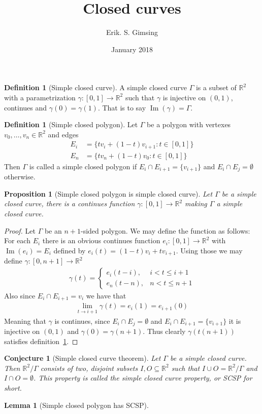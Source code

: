 \documentclass[a4paper,11pt]{article}
\title{Closed curves}
\author{Erik. S. Gimsing}
\date{January 2018}
\theoremstyle{plain}
\newtheorem{proposition}[theorem]{Proposition}
\newtheorem{lemma}[theorem]{Lemma}
\newtheorem{conjecture}[theorem]{Conjecture}
\theoremstyle{definition}
\newtheorem{definition}[theorem]{Definition}
\newcommand{\R}{\mathbb{R}}
\DeclareMathOperator{\im}{Im}
\begin{document}
\maketitle
\begin{definition}[Simple closed curve]\label{def:simple_closed_curve}
	A simple closed curve $\Gamma$ is a subset of $\R^2$ with a parametrization
	$\gamma:[0,1]\to\R^2$ such that $\gamma$ is injective on $(0,1)$, continues
	and $\gamma(0)=\gamma(1)$. That is to say $\im(\gamma)=\Gamma$.
\end{definition}
\begin{definition}[Simple closed polygon]\label{def:simple_closed_polygon}
	Let $\Gamma$ be a polygon with vertexes $v_0,\dots,v_n\in\R^2$ and edges
	\begin{align*}
		E_i &= \{tv_i+(1-t)v_{i+1}:t\in[0,1]\} \\
		E_n &= \{tv_n+(1-t)v_0:t\in[0,1]\}
	\end{align*}
	Then $\Gamma$ is called a simple closed polygon if $E_i\cap
	E_{i+1}=\{v_{i+1}\}$ and $E_i\cap E_j = \emptyset$ otherwise.
\end{definition}
\begin{proposition}[Simple closed polygon is simple closed
	curve]\label{prop:polygon_is_curve}
	Let $\Gamma$ be a simple closed curve, there is a continues function
	$\gamma:[0,1]\to\R^2$ making $\Gamma$ a simple closed curve.
\end{proposition}
\begin{proof}
	Let $\Gamma$ be an $n+1$-sided polygon. We may define the function
	as follows: For each $E_i$ there is an obvious continues function
	$e_i:[0,1]\to\R^2$ with $\im(e_i) = E_i$ defined by
	$e_i(t)=(1-t)v_i+tv_{i+1}$. Using those we may define
	$\gamma:[0,n+1]\to\R^2$
	\begin{align*}
		\gamma(t) =
		\begin{cases}
			e_i(t-i), & i < t \leq i+1 \\
			e_n(t-n), & n < t \leq n+1
		\end{cases}
	\end{align*}
	Also since $E_i\cap E_{i+1} = v_i$ we have that
	\begin{align*}
		\lim_{t\to i+1} \gamma(t) = e_i(1) = e_{i+1}(0)
	\end{align*}
	Meaning that $\gamma$ is continues, since $E_i\cap E_j = \emptyset$
	and $E_i\cap E_{i+1}=\{v_{i+1}\}$ it is injective on
	$(0,1)$ and $\gamma(0)=\gamma(n+1)$. Thus clearly $\gamma(t(n+1))$
	satisfies definition~\ref{def:simple_closed_curve}.
\end{proof}
\begin{conjecture}[Simple closed curve theorem]
	Let $\Gamma$ be a simple closed curve. Then $\R^2/\Gamma$ consists of two,
	disjoint subsets $I,O\subseteq\R^2$ such that $I\cup O =\R^2/\Gamma$ and
	$I\cap O = \emptyset$. This property is called the simple closed curve
	property, or SCSP for short.
\end{conjecture}
\begin{lemma}[Simple closed polygon has SCSP]
\end{lemma}
\end{document}
